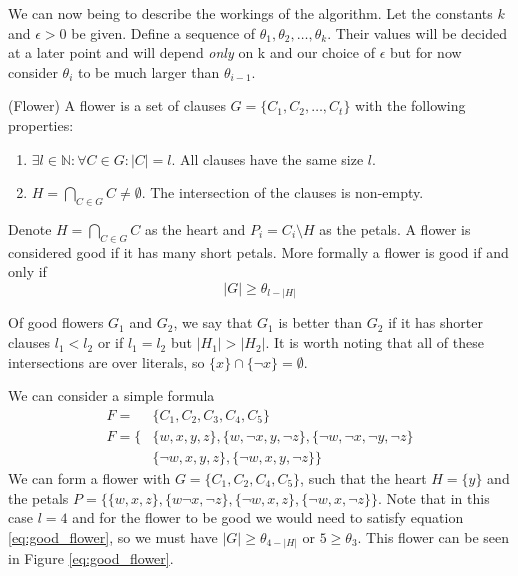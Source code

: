 We can now being to describe the workings of the algorithm. Let the constants
$k$ and $\epsilon > 0$ be given. Define a sequence of $\theta_1, \theta_2, \dots, \theta_k$.
Their values will be decided at a later point
and will depend \textit{only} on k and our choice of $\epsilon$
but for now consider $\theta_i$ to be much larger than $\theta_{i-1}$.

\begin{definition}
    (Flower) A flower is a set of clauses $G = \{C_1, C_2, \dots, C_t\}$ with the following properties:
    \begin{enumerate}
        \item $\exists l \in \mathbb{N}: \forall C \in G: |C| = l$. All clauses have the same size $l$.
        \item $H = \bigcap_{C \in G} C \neq \emptyset$. The intersection of the clauses is non-empty.
    \end{enumerate}
    Denote $H = \bigcap_{C \in G} C$ as the heart and $P_i = C_i \setminus H$ as the petals. A flower
    is considered good if it has many short petals. More formally a flower is good if and only if
    \begin{equation} \label{eq:good_flower}
        |G| \geq \theta_{l - |H|}
    \end{equation}
\end{definition}

Of good flowers $G_1$ and $G_2$, we say that $G_1$ is better than $G_2$ if it has shorter clauses
$l_1 < l_2$ or if $l_1 = l_2$ but $|H_1| > |H_2|$.
It is worth noting that all of these intersections are over literals, so $\{x\} \cap \{\neg x\} = \emptyset$.

\begin{example}
    We can consider a simple formula
    \begin{align*}
    F = &\{C_1, C_2, C_3, C_4, C_5\} \\
    F = \{ &\{w, x, y, z\}, \{w, \neg x, y, \neg z\}, \{\neg w, \neg x, \neg y, \neg z\} \\
    &\{\neg w, x, y, z\}, \{\neg w, x, y, \neg z\} \}
    \end{align*}
    We can form a flower with $G = \{C_1, C_2, C_4, C_5\}$, such that the heart $H = \{y\}$
    and the petals $P = \{\{w, x, z\}, \{w \neg x, \neg z\}, \{\neg w, x, z\}, \{\neg w, x, \neg z\}\}$.
    Note that in this case $l = 4$ and for the flower to be good we would need to satisfy equation 
    \ref{eq:good_flower}, so we must have $|G| \geq \theta_{4 - |H|}$ or $5 \geq \theta_{3}$.
    This flower can be seen in Figure \ref{eq:good_flower}.
\end{example}

